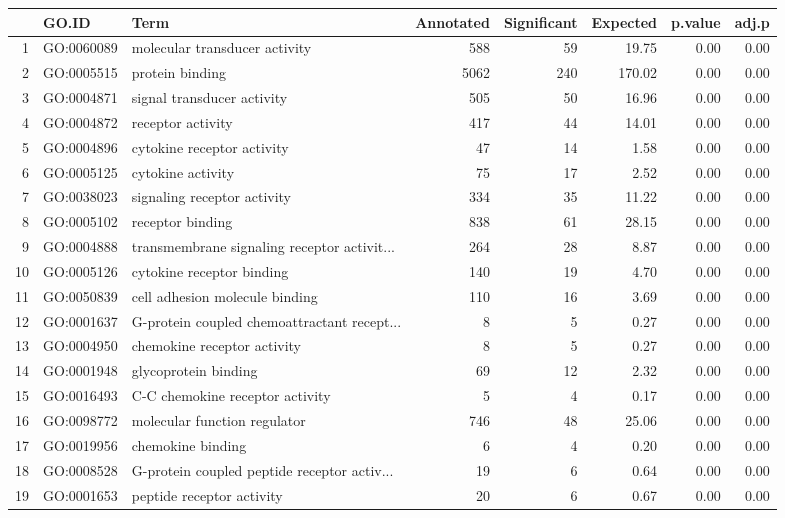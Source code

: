 \begin{table}[ht]
\centering
\begin{tabular}{rllrrrrr}
  \hline
 & GO.ID & Term & Annotated & Significant & Expected & p.value & adj.p \\ 
  \hline
1 & GO:0060089 & molecular transducer activity & 588 &  59 & 19.75 & 0.00 & 0.00 \\ 
  2 & GO:0005515 & protein binding & 5062 & 240 & 170.02 & 0.00 & 0.00 \\ 
  3 & GO:0004871 & signal transducer activity & 505 &  50 & 16.96 & 0.00 & 0.00 \\ 
  4 & GO:0004872 & receptor activity & 417 &  44 & 14.01 & 0.00 & 0.00 \\ 
  5 & GO:0004896 & cytokine receptor activity &  47 &  14 & 1.58 & 0.00 & 0.00 \\ 
  6 & GO:0005125 & cytokine activity &  75 &  17 & 2.52 & 0.00 & 0.00 \\ 
  7 & GO:0038023 & signaling receptor activity & 334 &  35 & 11.22 & 0.00 & 0.00 \\ 
  8 & GO:0005102 & receptor binding & 838 &  61 & 28.15 & 0.00 & 0.00 \\ 
  9 & GO:0004888 & transmembrane signaling receptor activit... & 264 &  28 & 8.87 & 0.00 & 0.00 \\ 
  10 & GO:0005126 & cytokine receptor binding & 140 &  19 & 4.70 & 0.00 & 0.00 \\ 
  11 & GO:0050839 & cell adhesion molecule binding & 110 &  16 & 3.69 & 0.00 & 0.00 \\ 
  12 & GO:0001637 & G-protein coupled chemoattractant recept... &   8 &   5 & 0.27 & 0.00 & 0.00 \\ 
  13 & GO:0004950 & chemokine receptor activity &   8 &   5 & 0.27 & 0.00 & 0.00 \\ 
  14 & GO:0001948 & glycoprotein binding &  69 &  12 & 2.32 & 0.00 & 0.00 \\ 
  15 & GO:0016493 & C-C chemokine receptor activity &   5 &   4 & 0.17 & 0.00 & 0.00 \\ 
  16 & GO:0098772 & molecular function regulator & 746 &  48 & 25.06 & 0.00 & 0.00 \\ 
  17 & GO:0019956 & chemokine binding &   6 &   4 & 0.20 & 0.00 & 0.00 \\ 
  18 & GO:0008528 & G-protein coupled peptide receptor activ... &  19 &   6 & 0.64 & 0.00 & 0.00 \\ 
  19 & GO:0001653 & peptide receptor activity &  20 &   6 & 0.67 & 0.00 & 0.00 \\ 

\end{tabular}
\end{table}
